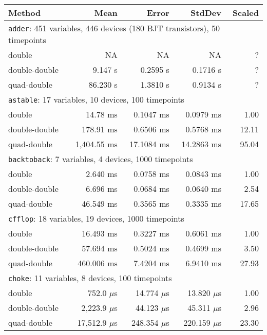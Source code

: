 \begin{center}
	\begin{longtable}{|l|r|r|r|r|}
		\hline
Method &          Mean &         Error &        StdDev & Scaled   \\ \hline \hline
\multicolumn{5}{|l|}{\texttt{adder}: 451 variables, 446 devices (180 BJT transistors), 50 timepoints}  \\ \hline
double  &       NA &       NA &       NA &      ?   \\
double-double  &  9.147 s & 0.2595 s & 0.1716 s &      ?   \\
quad-double  & 86.230 s & 1.3810 s & 0.9134 s &      ?   \\
\hline \hline
\multicolumn{5}{|l|}{\texttt{astable}: 17 variables, 10 devices, 100 timepoints}  \\ \hline
double  &    14.78 ms &  0.1047 ms &  0.0979 ms &   1.00   \\
double-double  &   178.91 ms &  0.6506 ms &  0.5768 ms &  12.11   \\
quad-double  & 1,404.55 ms & 17.1084 ms & 14.2863 ms &  95.04   \\
\hline \hline
\multicolumn{5}{|l|}{\texttt{backtoback}: 7 variables, 4 devices, 1000 timepoints}   \\ \hline
double  &   2.640 ms & 0.0758 ms & 0.0843 ms &    1.00   \\
double-double  &   6.696 ms & 0.0684 ms & 0.0640 ms &   2.54   \\
quad-double  &  46.549 ms & 0.3565 ms & 0.3335 ms &  17.65   \\
\hline \hline
\multicolumn{5}{|l|}{\texttt{cfflop}: 18 variables, 19 devices, 1000 timepoints}  \\ \hline
double  &  16.493 ms & 0.3227 ms & 0.6061 ms &   1.00   \\
double-double  &  57.694 ms & 0.5024 ms & 0.4699 ms &   3.50   \\
quad-double  & 460.006 ms & 7.4204 ms & 6.9410 ms &  27.93   \\
\hline \hline
\multicolumn{5}{|l|}{\texttt{choke}: 11 variables, 8 devices, 100 timepoints}  \\ \hline
double  &    752.0 $\mu{}$s &  14.774 $\mu{}$s &  13.820 $\mu{}$s &   1.00   \\
double-double  &  2,223.9 $\mu{}$s &  44.123 $\mu{}$s &  45.311 $\mu{}$s &   2.96   \\
quad-double  & 17,512.9 $\mu{}$s & 248.354 $\mu{}$s & 220.159 $\mu{}$s &  23.30   \\

\end{longtable}
\end{center}
